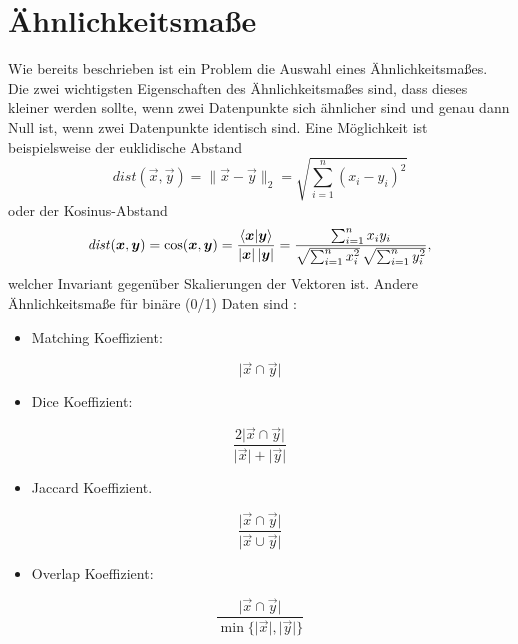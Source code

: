 	\section{Ähnlichkeitsmaße}
		Wie bereits beschrieben ist ein Problem die Auswahl eines Ähnlichkeitsmaßes. Die zwei wichtigsten Eigenschaften des Ähnlichkeitsmaßes sind, dass dieses kleiner werden sollte, wenn zwei Datenpunkte sich ähnlicher sind und genau dann Null ist, wenn zwei Datenpunkte identisch sind. Eine Möglichkeit ist beispielsweise der euklidische Abstand
		\begin{equation}
			\mathit{dist}(\vec{x}, \vec{y}) = \lVert \vec{x} - \vec{y} \rVert_2 = \sqrt{\textstyle \sum_{i = 1}^{n} (x_i - y_i)^2}
		\end{equation}
		oder der Kosinus-Abstand
		\begin{equation}
			\mathit{dist}(\bm{x}, \bm{y}) = \cos(\bm{x}, \bm{y}) = \frac{\braket{\bm{x}}{\bm{y}}}{\lvert \bm{x} \rvert \, \lvert \bm{y} \rvert} = \frac{\sum_{i = 1}^{n} x_i y_i}{\sqrt{\sum_{i = 1}^{n} x_i^2} \, \sqrt{\sum_{i = 1}^{n} y_i^2}},
		\end{equation}
		welcher Invariant gegenüber Skalierungen der Vektoren ist. Andere Ähnlichkeitsmaße für binäre (0/1) Daten sind \zB:
		\begin{itemize}
			\item Matching Koeffizient:
		\end{itemize}
		\begin{equation}
			\lvert \vec{x} \cap \vec{y} \rvert
		\end{equation}
		\begin{itemize}
			\item Dice Koeffizient:
		\end{itemize}
		\begin{equation}
			\frac{2 \lvert \vec{x} \cap \vec{y} \rvert}{\lvert \vec{x} \rvert + \lvert \vec{y} \rvert}
		\end{equation}
		\begin{itemize}
			\item Jaccard Koeffizient.
		\end{itemize}
		\begin{equation}
			\frac{\lvert \vec{x} \cap \vec{y} \rvert}{\lvert \vec{x} \cup \vec{y} \rvert}
		\end{equation}
		\begin{itemize}
			\item Overlap Koeffizient:
		\end{itemize}
		\begin{equation}
			\frac{\lvert \vec{x} \cap \vec{y} \rvert}{\min \{ \lvert \vec{x} \rvert, \lvert \vec{y} \rvert \}}
		\end{equation}
